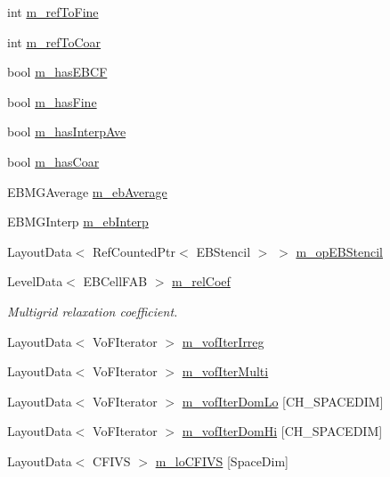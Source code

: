 \begin{DoxyCompactItemize}
\item 
int \hyperlink{classebconductivityop_a03974b0dad4bbd5d9993641ff7cacdd4}{m\+\_\+ref\+To\+Fine}
\item 
int \hyperlink{classebconductivityop_ae7b853b8846354622396507961b7d764}{m\+\_\+ref\+To\+Coar}
\item 
bool \hyperlink{classebconductivityop_a81c48a80f60209d8971f0c5072033f7c}{m\+\_\+has\+E\+B\+CF}
\item 
bool \hyperlink{classebconductivityop_aeaf671beb896557adea42082b5b46ffe}{m\+\_\+has\+Fine}
\item 
bool \hyperlink{classebconductivityop_a29aa51762dec1f0d65ba9d1695c2c86c}{m\+\_\+has\+Interp\+Ave}
\item 
bool \hyperlink{classebconductivityop_add00374585314f0ec1aca1b873835b82}{m\+\_\+has\+Coar}
\item 
E\+B\+M\+G\+Average \hyperlink{classebconductivityop_aa24a66f5fd4538ffe9d4c4509b10f58b}{m\+\_\+eb\+Average}
\item 
E\+B\+M\+G\+Interp \hyperlink{classebconductivityop_ac7f2e44076a11912860b47052556845d}{m\+\_\+eb\+Interp}
\item 
Layout\+Data$<$ Ref\+Counted\+Ptr$<$ E\+B\+Stencil $>$ $>$ \hyperlink{classebconductivityop_a2c3401e8c149a7b9a45ef713b596a9db}{m\+\_\+op\+E\+B\+Stencil}
\item 
Level\+Data$<$ E\+B\+Cell\+F\+AB $>$ \hyperlink{classebconductivityop_a63a52940fcc2ae9a1dd8e2762fb239e4}{m\+\_\+rel\+Coef}
\begin{DoxyCompactList}\small\item\em Multigrid relaxation coefficient. \end{DoxyCompactList}\item 
Layout\+Data$<$ Vo\+F\+Iterator $>$ \hyperlink{classebconductivityop_a8b503f34a1dc5a34cc591fd1ad3a65d8}{m\+\_\+vof\+Iter\+Irreg}
\item 
Layout\+Data$<$ Vo\+F\+Iterator $>$ \hyperlink{classebconductivityop_aabb108186c19d716777d854786c9740e}{m\+\_\+vof\+Iter\+Multi}
\item 
Layout\+Data$<$ Vo\+F\+Iterator $>$ \hyperlink{classebconductivityop_a431522b2bd75c2e1e5e292ce736819d4}{m\+\_\+vof\+Iter\+Dom\+Lo} \mbox{[}C\+H\+\_\+\+S\+P\+A\+C\+E\+D\+IM\mbox{]}
\item 
Layout\+Data$<$ Vo\+F\+Iterator $>$ \hyperlink{classebconductivityop_a4ffec1cfb6a6fd836405e169c8a10a7c}{m\+\_\+vof\+Iter\+Dom\+Hi} \mbox{[}C\+H\+\_\+\+S\+P\+A\+C\+E\+D\+IM\mbox{]}
\item 
Layout\+Data$<$ C\+F\+I\+VS $>$ \hyperlink{classebconductivityop_af20f1aa4c42e4f9e7463d6ba26895bae}{m\+\_\+lo\+C\+F\+I\+VS} \mbox{[}Space\+Dim\mbox{]}

\end{DoxyCompactItemize}
